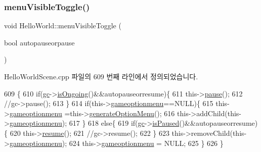 \subsubsection{\texorpdfstring{menu\+Visible\+Toggle()}{menuVisibleToggle()}}
{\footnotesize\ttfamily void Hello\+World\+::menu\+Visible\+Toggle (\begin{DoxyParamCaption}\item[{bool}]{autopauseorpause }\end{DoxyParamCaption})\hspace{0.3cm}{\ttfamily [protected]}}



Hello\+World\+Scene.\+cpp 파일의 609 번째 라인에서 정의되었습니다.


\begin{DoxyCode}
609                                                         \{
610     \textcolor{keywordflow}{if}(\hyperlink{class_hello_world_a547cb213126911d9a7151f8259dc7102}{gc}->\hyperlink{class_tetris_1_1_game_controller_aecd04e471f7819a8b3f80e0dda748bdc}{isOngoing}()&&autopauseorresume)\{
611         this->\hyperlink{class_hello_world_af72bece97d2fe997936df92723636298}{pause}();
612         \textcolor{comment}{//gc->pause();}
613     \}
614     \textcolor{keywordflow}{if}(this->\hyperlink{class_hello_world_aeb27a8750393a2d4982809b64454a045}{gameoptionmenu}==NULL)\{
615         this->\hyperlink{class_hello_world_aeb27a8750393a2d4982809b64454a045}{gameoptionmenu} =this->\hyperlink{class_hello_world_a24162678657656105f59887233f9c841}{generateOptionMenu}();
616         this->addChild(this->\hyperlink{class_hello_world_aeb27a8750393a2d4982809b64454a045}{gameoptionmenu});
617     \}
618     \textcolor{keywordflow}{else}\{
619         \textcolor{keywordflow}{if}(\hyperlink{class_hello_world_a547cb213126911d9a7151f8259dc7102}{gc}->\hyperlink{class_tetris_1_1_game_controller_a18e513f45750361e14af091704e9f1d4}{isPaused}()&&autopauseorresume)\{
620             this->\hyperlink{class_hello_world_ad72b45627fe36ea8cd04b9de431edc7f}{resume}();
621             \textcolor{comment}{//gc->resume();}
622         \}
623         this->removeChild(this->\hyperlink{class_hello_world_aeb27a8750393a2d4982809b64454a045}{gameoptionmenu});
624         this->\hyperlink{class_hello_world_aeb27a8750393a2d4982809b64454a045}{gameoptionmenu} = NULL;
625     \}
626 \}
\end{DoxyCode}
\mbox{\label{class_hello_world_a0e47c5b1692f5ba74b776be85422dc75}} 
